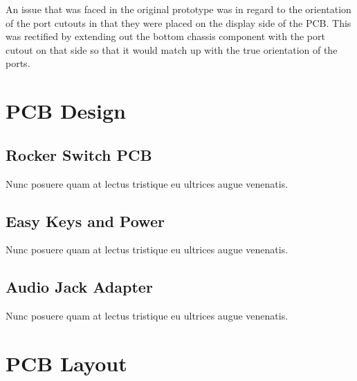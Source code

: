 An issue that was faced in the original prototype was in regard to the orientation of the port cutouts in that they were placed on the display side of the PCB.
This was rectified by extending out the bottom chassis component with the port cutout on that side so that it would match up with the true orientation of the ports. %


\section{PCB Design}


\subsection{Rocker Switch PCB}

Nunc posuere quam at lectus tristique eu ultrices augue venenatis.

\subsection{Easy Keys and Power}

Nunc posuere quam at lectus tristique eu ultrices augue venenatis.

\subsection{Audio Jack Adapter}

Nunc posuere quam at lectus tristique eu ultrices augue venenatis.



\section{PCB Layout}

